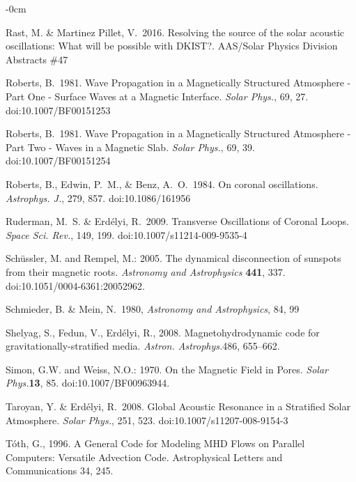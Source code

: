 \documentclass[physics,article,submit,pdftex,moreauthors]{Definitions/mdpi}
\newcommand{\aap}{{\it Astron. Astrophys.}}
\newcommand{\apj}{{\it Astrophys. J.}}
\newcommand{\solphys}{{\it Solar Phys.}}
\newcommand{\ssr}{{\it Space Sci. Rev.}}
\begin{document}
\begin{adjustwidth}{-\extralength}{0cm}
\begin{thebibliography}{999}
 Rast, M. \& Martinez Pillet, V.\ 2016. {Resolving the source of the solar acoustic oscillations: What will be possible with DKIST?}. AAS/Solar Physics Division Abstracts \#47


 Roberts, B.\ 1981. {Wave Propagation in a Magnetically Structured Atmosphere - Part One - Surface Waves at a Magnetic Interface}. \solphys, 69, 27. doi:10.1007/BF00151253

 Roberts, B.\ 1981. {Wave Propagation in a Magnetically Structured Atmosphere - Part Two - Waves in a Magnetic Slab}. \solphys, 69, 39. doi:10.1007/BF00151254

 Roberts, B., Edwin, P.~M., \& Benz, A.~O.\ 1984. {On coronal oscillations}. \apj, 279, 857. doi:10.1086/161956

 Ruderman, M.~S. \& Erd{\'e}lyi, R.\ 2009. {Transverse Oscillations of Coronal Loops}. \ssr, 149, 199. doi:10.1007/s11214-009-9535-4

Sch{\"u}ssler, M. and Rempel, M.: 2005. {The dynamical disconnection of sunspots from their magnetic roots}. {\it Astronomy and Astrophysics} {\bf 441}, 337. doi:10.1051/0004-6361:20052962.

 Schmieder, B. \& Mein, N.\ 1980, {\it Astronomy and Astrophysics}, 84, 99

{Shelyag}, S., {Fedun}, V., {Erd{\'e}lyi}, R., 2008. {Magnetohydrodynamic code
  for gravitationally-stratified media}. \aap 486, 655--662.

Simon, G.W. and Weiss, N.O.: 1970. {On the Magnetic Field in Pores}. \solphys {\bf 13}, 85. doi:10.1007/BF00963944.

 Taroyan, Y. \& Erd{\'e}lyi, R.\ 2008. {Global Acoustic Resonance in a Stratified Solar Atmosphere}. \solphys, 251, 523. doi:10.1007/s11207-008-9154-3



{T{\'o}th}, G., 1996. {A General Code for Modeling {MHD} Flows on Parallel
  Computers: Versatile Advection Code}. Astrophysical Letters and
  Communications 34, 245.


\end{thebibliography}
\end{adjustwidth}
\end{document}
